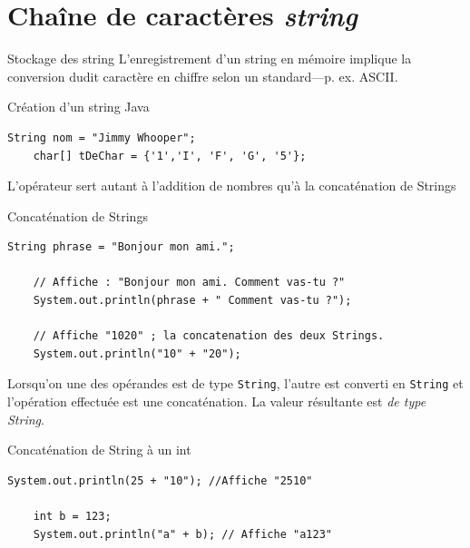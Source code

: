 \documentclass{report}
\begin{document}
\section{Chaîne de caractères \textit{string}}
\begin{Concept*}{Stockage des string}
	L'enregistrement d'un string en mémoire implique la conversion dudit caractère en chiffre selon un standard—p. ex. ASCII.
\end{Concept*}

\begin{EExample*}{Création d'un string Java}{}
\begin{lstlisting}[style=JavaDraculaWhite]
	String nom = "Jimmy Whooper";
	char[] tDeChar = {'1','I', 'F', 'G', '5'};
\end{lstlisting}
\end{EExample*}

\begin{note}
L'opérateur \entouree[gray]{\texttt{\footnotesize{+}}} sert 
autant à l'addition de nombres qu'à la concaténation de Strings
\end{note}

\begin{EExample*}{Concaténation de Strings}{}
\begin{lstlisting}[style=JavaDraculaWhite]
	String phrase = "Bonjour mon ami.";

	// Affiche : "Bonjour mon ami. Comment vas-tu ?"
    System.out.println(phrase + " Comment vas-tu ?");

	// Affiche "1020" ; la concatenation des deux Strings.
	System.out.println("10" + "20");
\end{lstlisting}
\end{EExample*}

\begin{note}
Lorsqu'on une des opérandes est de type 
\texttt{\footnotesize{String}}, l'autre est converti en 
\texttt{\footnotesize{String}} et l'opération effectuée
est une concaténation. La valeur résultante est \textit{de type String}.	 
\end{note}

\begin{EExample*}{Concaténation de String à un int}{}
\begin{lstlisting}[style=JavaDraculaWhite]
	System.out.println(25 + "10"); //Affiche "2510"
	
	int b = 123;
	System.out.println("a" + b); // Affiche "a123"
\end{lstlisting}
\end{EExample*}
\end{document}
